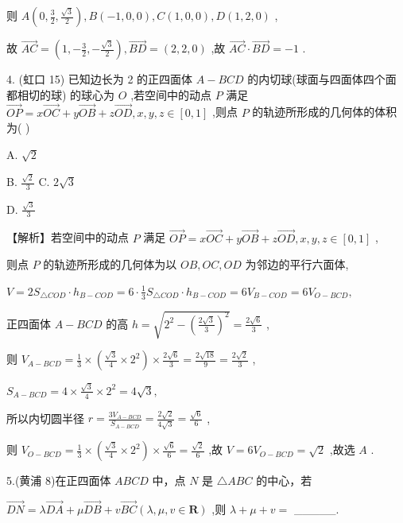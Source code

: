 \documentclass[10pt]{article}
\begin{document}
则 \(A\left( {0,\frac{3}{2},\frac{\sqrt{3}}{2}}\right) ,B\left( {-1,0,0}\right) ,C\left( {1,0,0}\right) ,D\left( {1,2,0}\right)\) ,

故 \(\overrightarrow{AC} = \left( {1, - \frac{3}{2}, - \frac{\sqrt{3}}{2}}\right) ,\overrightarrow{BD} = \left( {2,2,0}\right)\) ,故 \(\overrightarrow{AC} \cdot  \overrightarrow{BD} =  - 1\) .

4. (虹口 15) 已知边长为 2 的正四面体 \(A - {BCD}\) 的内切球(球面与四面体四个面都相切的球) 的球心为 \(O\) ,若空间中的动点 \(P\) 满足 \(\overrightarrow{OP} = x\overrightarrow{OC} + y\overrightarrow{OB} + z\overrightarrow{OD},x,y,z \in  \left\lbrack  {0,1}\right\rbrack\) ,则点 \(P\) 的轨迹所形成的几何体的体积为( )

A. \(\sqrt{2}\)

B. \(\frac{\sqrt{2}}{3}\) C. \(2\sqrt{3}\)

D. \(\frac{\sqrt{3}}{3}\)

【解析】若空间中的动点 \(P\) 满足 \(\overrightarrow{OP} = x\overrightarrow{OC} + y\overrightarrow{OB} + z\overrightarrow{OD},x,y,z \in  \left\lbrack  {0,1}\right\rbrack\) ,

则点 \(P\) 的轨迹所形成的几何体为以 \({OB},{OC},{OD}\) 为邻边的平行六面体,

\(V = 2{S}_{\bigtriangleup {COD}} \cdot  {h}_{B - {COD}} = 6 \cdot  \frac{1}{3}{S}_{\bigtriangleup {COD}} \cdot  {h}_{B - {COD}} = 6{V}_{B - {COD}} = 6{V}_{O - {BCD}},\)

正四面体 \(A - {BCD}\) 的高 \(h = \sqrt{{2}^{2} - {\left( \frac{2\sqrt{3}}{3}\right) }^{2}} = \frac{2\sqrt{6}}{3}\) ,

则 \({V}_{A - {BCD}} = \frac{1}{3} \times  \left( {\frac{\sqrt{3}}{4} \times  {2}^{2}}\right)  \times  \frac{2\sqrt{6}}{3} = \frac{2\sqrt{18}}{9} = \frac{2\sqrt{2}}{3}\) ,

\({S}_{A - {BCD}} = 4 \times  \frac{\sqrt{3}}{4} \times  {2}^{2} = 4\sqrt{3},\)

所以内切圆半径 \(r = \frac{3{V}_{A - {BCD}}}{{S}_{A - {BCD}}} = \frac{2\sqrt{2}}{4\sqrt{3}} = \frac{\sqrt{6}}{6}\) ,

则 \({V}_{O - {BCD}} = \frac{1}{3} \times  \left( {\frac{\sqrt{3}}{4} \times  {2}^{2}}\right)  \times  \frac{\sqrt{6}}{6} = \frac{\sqrt{2}}{6}\) ,故 \(V = 6{V}_{O - {BCD}} = \sqrt{2}\) ,故选 \(A\) .

5.(黄浦 8)在正四面体 \({ABCD}\) 中，点 \(N\) 是 \(\bigtriangleup  {ABC}\) 的中心，若

\(\overrightarrow{DN} = \lambda \overrightarrow{DA} + \mu \overrightarrow{DB} + v\overrightarrow{BC}\left( {\lambda ,\mu ,v \in  \mathbf{R}}\right)\) ,则 \(\lambda  + \mu  + v =\) \_\_\_\_\_.
\end{document}
